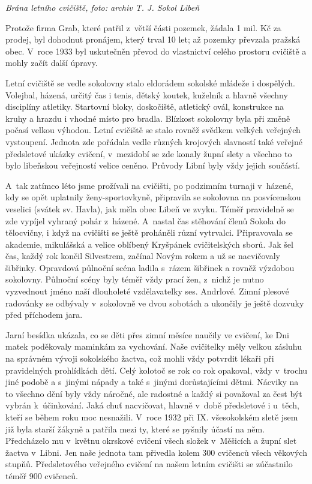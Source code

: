 \documentclass[a5paper, 12pt, twoside]{article}
\begin{document}
\textit{Brána letního cvičiště, foto: archiv T. J. Sokol Libeň}

Protože firma Grab, které patřil z~větší části pozemek, žádala 1 mil. Kč
za prodej, byl dohodnut pronájem, který trval 10 let; až pozemky
převzala pražská obec. V~roce 1933 byl uskutečněn převod do vlastnictví
celého prostoru cvičiště a mohly začít další úpravy.

Letní cvičiště se vedle sokolovny stalo eldorádem sokolské mládeže i
dospělých. Volejbal, házená, určitý čas i tenis, dětský koutek, kuželník
a hlavně všechny disciplíny atletiky. Startovní bloky, doskočiště,
atletický ovál, konstrukce na kruhy a hrazdu i vhodné místo pro bradla.
Blízkost sokolovny byla při změně počasí velkou výhodou. Letní cvičiště
se stalo rovněž svědkem velkých veřejných vystoupení. Jednota zde
pořádala vedle různých krojových slavností také veřejné předsletové
ukázky cvičení, v~mezidobí se zde konaly župní slety a všechno to bylo
libeňskou veřejností velice ceněno. Průvody Libní byly vždy jejich
součástí.

A~tak zatímco léto jsme prožívali na cvičišti, po podzimním turnaji
v~házené, kdy se opět uplatnily ženy-sportovkyně, připravila se sokolovna
na posvícenskou veselici (svátek sv. Havla), jak měla obec Libeň ve
zvyku. Téměř pravidelně se zde vypíjel vyhraný pohár z~házené. A~nastal
čas stěhování členů Sokola do tělocvičny, i když na cvičišti se ještě
proháněli různí vytrvalci. Připravovala se akademie, mikulášská a velice
oblíbený Kryšpánek cvičitelských sborů. Jak šel čas, každý rok končil
Silvestrem, začínal Novým rokem a už se nacvičovaly šibřinky. Opravdová
půlnoční scéna ladila s~rázem šibřinek a rovněž výzdobou sokolovny.
Půlnoční scény byly téměř vždy prací žen, z~nichž je nutno vyzvednout
jméno naší dlouholeté vzdělavatelky ses. Andrlové. Zimní plesové
radovánky se odbývaly v~sokolovně ve dvou sobotách a ukončily je ještě
dozvuky před příchodem jara.

Jarní besídka ukázala, co se děti přes zimní měsíce naučily ve cvičení,
ke Dni matek poděkovaly maminkám za vychování. Naše cvičitelky měly
velkou zásluhu na správném vývoji sokolského žactva, což mohli vždy
potvrdit lékaři při pravidelných prohlídkách dětí. Celý kolotoč se rok
co rok opakoval, vždy v~trochu jiné podobě a s~jinými nápady a také
s~jinými dorůstajícími dětmi. Nácviky na to všechno dění byly vždy
náročné, ale radostné a každý si považoval za čest být vybrán
k~účinkování. Jaká chuť nacvičovat, hlavně v~době předsletové i u~těch,
kteří se během roku moc nesnažili. V~roce 1932 při IX. všesokolském
sletě jsem již byla starší žákyně a patřila mezi ty, které se pyšnily
účastí na něm. Předcházelo mu v~květnu okrskové cvičení všech složek
v~Měšicích a župní slet žactva v~Libni. Jen naše jednota tam přivedla
kolem 300 cvičenců všech věkových stupňů. Předsletového veřejného
cvičení na našem letním cvičišti se zúčastnilo téměř 900 cvičenců.
\end{document}
